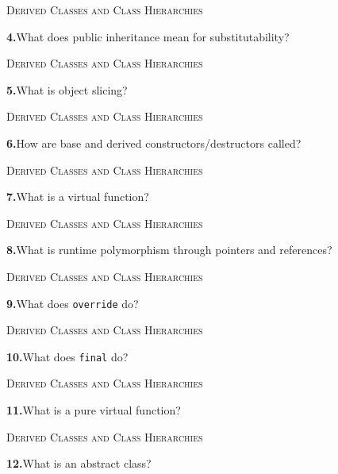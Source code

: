 \documentclass[11pt,a4paper]{article}
\newenvironment{questionblock}{%
  \begin{minipage}[t][0.455\textheight][t]{\textwidth}%
  \raggedright\small
}{%
  \vfill
  \end{minipage}%
}
\newcommand{\sectionlabel}[1]{\textsc{#1}\par\vspace{0.35em}}
\newcommand{\questionnumber}[1]{\textbf{#1.}\enspace}
\begin{document}
\newpage
\begin{questionblock}
\sectionlabel{Derived Classes and Class Hierarchies}
\questionnumber{4}What does public inheritance mean for substitutability?\par
\end{questionblock}
\vspace*{0.04\textheight}
\begin{questionblock}
\sectionlabel{Derived Classes and Class Hierarchies}
\questionnumber{5}What is object slicing?\par
\end{questionblock}
\newpage
\begin{questionblock}
\sectionlabel{Derived Classes and Class Hierarchies}
\questionnumber{6}How are base and derived constructors/destructors called?\par
\end{questionblock}
\vspace*{0.04\textheight}
\begin{questionblock}
\sectionlabel{Derived Classes and Class Hierarchies}
\questionnumber{7}What is a virtual function?\par
\end{questionblock}
\newpage
\begin{questionblock}
\sectionlabel{Derived Classes and Class Hierarchies}
\questionnumber{8}What is runtime polymorphism through pointers and references?\par
\end{questionblock}
\vspace*{0.04\textheight}
\begin{questionblock}
\sectionlabel{Derived Classes and Class Hierarchies}
\questionnumber{9}What does \verb|override| do?\par
\end{questionblock}
\newpage
\begin{questionblock}
\sectionlabel{Derived Classes and Class Hierarchies}
\questionnumber{10}What does \verb|final| do?\par
\end{questionblock}
\vspace*{0.04\textheight}
\begin{questionblock}
\sectionlabel{Derived Classes and Class Hierarchies}
\questionnumber{11}What is a pure virtual function?\par
\end{questionblock}
\newpage
\begin{questionblock}
\sectionlabel{Derived Classes and Class Hierarchies}
\questionnumber{12}What is an abstract class?\par
\end{questionblock}
\end{document}
